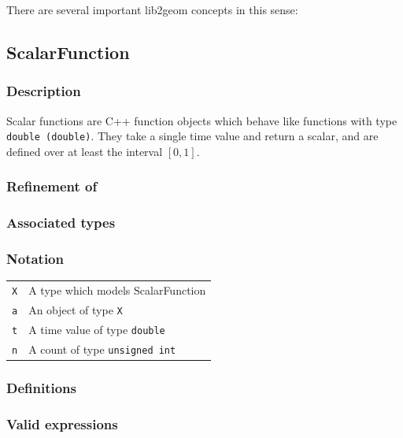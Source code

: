 \documentclass[openany]{book}
\begin{document}
There are several important lib2geom concepts in this sense:

\subsection{ScalarFunction}

\subsubsection{Description}

Scalar functions are C++ function objects which behave like functions
with type {\tt double (double)}.  They take a single time value and return
a scalar, and are defined over at least the interval $[0, 1]$.

\subsubsection{Refinement of}

\subsubsection{Associated types}

\subsubsection{Notation}

\begin{tabular}{r l}
  {\tt X} & A type which models ScalarFunction \\
  {\tt a} & An object of type {\tt X} \\
  {\tt t} & A time value of type {\tt double} \\
  {\tt n} & A count of type {\tt unsigned int} \\
\end{tabular}

\subsubsection{Definitions}

\subsubsection{Valid expressions}
\end{document}
